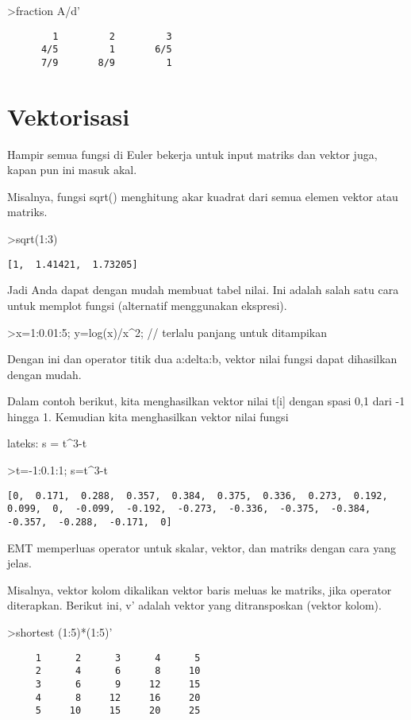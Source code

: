 \documentclass[
]{book}
\begin{document}
\textgreater fraction A/d'

\begin{verbatim}
        1         2         3 
      4/5         1       6/5 
      7/9       8/9         1 
\end{verbatim}

\chapter{Vektorisasi}\label{vektorisasi}

Hampir semua fungsi di Euler bekerja untuk input matriks dan vektor juga, kapan pun ini masuk akal.

Misalnya, fungsi sqrt() menghitung akar kuadrat dari semua elemen vektor atau matriks.

\textgreater sqrt(1:3)

\begin{verbatim}
[1,  1.41421,  1.73205]
\end{verbatim}

Jadi Anda dapat dengan mudah membuat tabel nilai. Ini adalah salah satu cara untuk memplot fungsi (alternatif menggunakan ekspresi).

\textgreater x=1:0.01:5; y=log(x)/x\^{}2; // terlalu panjang untuk ditampikan

Dengan ini dan operator titik dua a:delta:b, vektor nilai fungsi dapat dihasilkan dengan mudah.

Dalam contoh berikut, kita menghasilkan vektor nilai t{[}i{]} dengan spasi 0,1 dari -1 hingga 1. Kemudian kita menghasilkan vektor nilai fungsi

lateks: s = t\^{}3-t

\textgreater t=-1:0.1:1; s=t\^{}3-t

\begin{verbatim}
[0,  0.171,  0.288,  0.357,  0.384,  0.375,  0.336,  0.273,  0.192,
0.099,  0,  -0.099,  -0.192,  -0.273,  -0.336,  -0.375,  -0.384,
-0.357,  -0.288,  -0.171,  0]
\end{verbatim}

EMT memperluas operator untuk skalar, vektor, dan matriks dengan cara yang jelas.

Misalnya, vektor kolom dikalikan vektor baris meluas ke matriks, jika operator diterapkan. Berikut ini, v' adalah vektor yang ditransposkan (vektor kolom).

\textgreater shortest (1:5)*(1:5)'

\begin{verbatim}
     1      2      3      4      5 
     2      4      6      8     10 
     3      6      9     12     15 
     4      8     12     16     20 
     5     10     15     20     25 
\end{verbatim}
\end{document}
